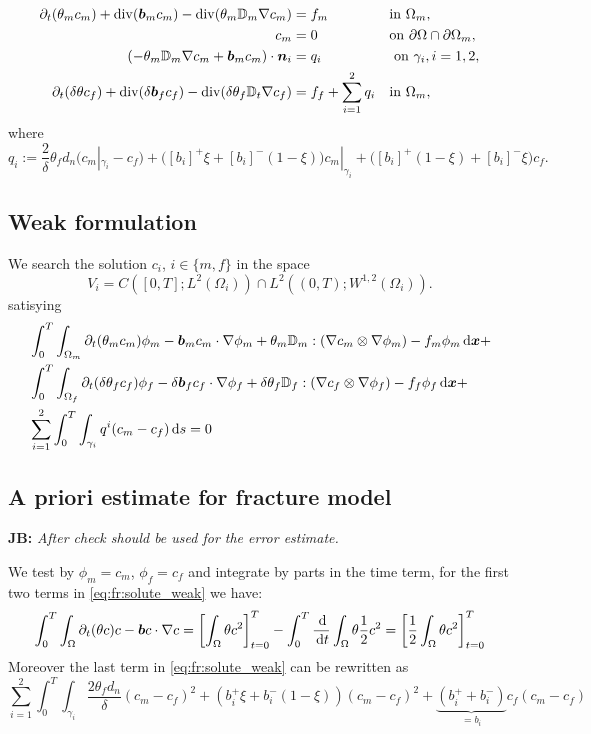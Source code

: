 \documentclass[a4paper]{article}
\def\prtl{\partial}
\def\vc#1{\mathbf{\boldsymbol{#1}}}     %
\def\tn#1{{\mathbb{#1}}}    %
\def\div{{\rm div}}
\def\grad{\nabla}
\def\d {\,{\rm d}}
\newcommand{\note}[2]{{\color{blue} \textbf{ #1:} \textit{#2}}}
\begin{document}
\begin{align}
  \label{eq:fr:solute}
  \prtl_t (\theta_m c_m) + \div(\vc b_m c_m) - \div(\theta_m \tn D_m \grad c_m) &= f_m&&  \text{in } \Omega_m,\\
  \label{eq:fr:Dirichlet}
  c_m &= 0&& \text{on } \partial\Omega\cap\partial\Omega_m,\\
  (- \theta_m \tn D_m\grad c_m + \vc b_m c_m) \cdot \vc n_i &= q_i &&\mbox{ on }\gamma_i,i=1,2,\\ 
  \prtl_t(\delta\theta c_f)  + \div(\delta \vc b_f c_f ) - \div( \delta \theta_f \tn D_t \grad c_f) 
      &= f_f + \sum_{i=1}^2 q_i&&  \text{in } \Omega_m,\\
\end{align}
where 
\[
    q_i:=\frac2\delta \theta_f d_n(c_m|_{\gamma_i} - c_f) 
    +  \big([b_i]^{+}\xi + [b_i]^{-}(1-\xi)\big) c_m|_{\gamma_i}
    +  \big([b_i]^{+}(1-\xi) + [b_i]^{-}\xi\big) c_f.
\]

\subsection{Weak formulation}
We search the solution $c_i$, $i\in \{m,f\}$ in the space 
\[
    V_i =C([0,T]; L^2(\Omega_i) ) \cap L^2( (0,T); W^{1,2}(\Omega_i) ).
\]    
satisying 
\begin{align}
\notag
&\int_0^T \int_{\Omega_m} \prtl_t(\theta_m c_m)\phi_m - \vc b_m c_m \cdot \grad \phi_m + \theta_m \tn D_m : (\grad c_m \otimes \grad \phi_m) - f_m\phi_m \d \vc x+\\
\label{eq:fr:solute_weak}
&\int_0^T \int_{\Omega_f} \prtl_t(\delta\theta_f c_f)\phi_f - \delta \vc b_f c_f \cdot \grad \phi_f + \delta \theta_f \tn D_f : (\grad c_f \otimes \grad \phi_f) - f_f\phi_f \d \vc x+\\
\notag
&\sum_{i=1}^{2} \int_0^T \int_{\gamma_i} q^i (c_m - c_f) \d s = 0
\end{align}


\subsection{A priori estimate for fracture model}
\note{JB}{After check should be used for the error estimate.}

We test by $\phi_m=c_m$, $\phi_f=c_f$ and integrate by parts in the time term, for the first two terms in \eqref{eq:fr:solute_weak} we have:
\[
    \int_0^T \int_{\Omega} \prtl_t(\theta c)c - \vc b c \cdot \grad c = 
    \left[
        \int_{\Omega} \theta c^2
    \right]_{t=0}^{T}
    -\int_0^T \frac{\d}{\d t} \int_{\Omega} \theta \frac12 c^2 =     
    \left[
        \frac12 \int_{\Omega} \theta c^2
    \right]_{t=0}^{T}
\]
Moreover the last term in \eqref{eq:fr:solute_weak} can be rewritten as
\[
   \sum_{i=1}^{2} \int_0^T \int_{\gamma_i} 
   \frac{2\theta_f d_n}{\delta} (c_m - c_f)^2
   + (b_i^+ \xi + b_i^-(1-\xi))(c_m-c_f)^2
   + \underbrace{(b_i^+ + b_i^-)}_{=b_i}c_f(c_m-c_f)
\]
\end{document}
